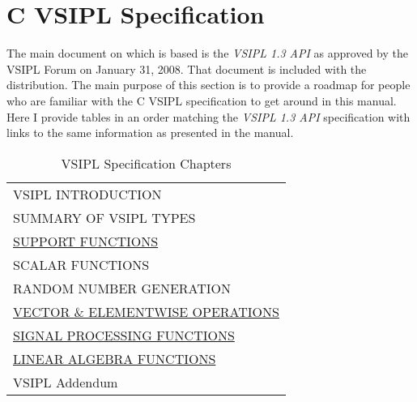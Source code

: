 \section*{C VSIPL Specification}
The main document on which  is based is the \emph{VSIPL 1.3 API} as approved by the VSIPL Forum on January 31, 2008.  That document is included with the  distribution.  The main purpose of this section is to provide a roadmap for people who are familiar with the C VSIPL specification to get around in this  manual.  Here I provide tables in an order matching the \emph{VSIPL 1.3 API} specification with links to the same information as presented  in the  manual.
\begin{table}[H]
\hypertarget{VSIPspecHead}{}
\caption{VSIPL Specification Chapters}
\label{tab:vsiplAPI}
\begin{center}
\begin{tabular}{l}
VSIPL INTRODUCTION\\
SUMMARY OF VSIPL TYPES\\
\hyperlink{vsiplAPISupport}{SUPPORT FUNCTIONS}\\
SCALAR FUNCTIONS\\
RANDOM NUMBER GENERATION\\
\hyperlink{vectorAndElementwise}{VECTOR \& ELEMENTWISE OPERATIONS}\\
\hyperlink{vsipljSignalProcessing}{SIGNAL PROCESSING FUNCTIONS}\\
\hyperlink{linearAlgebraFunctions}{LINEAR ALGEBRA FUNCTIONS}\\
VSIPL Addendum\\
\end{tabular}
\end{center}
\label{default}
\end{table}%